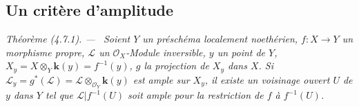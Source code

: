 \documentclass[10pt,oneside]{book}
\newcommand{\oldpage}[2][]{%
  \setcounter{footnote}{0}%
  \marginpar{\scriptsize\textbf{#1}~|~#2}\ignorespaces}
\newenvironment{theorem}[1][]{%
  \par\medskip\noindent\itshape Théorème (#1). ---\ }{\par}
\begin{document}
\oldpage[III]{145}

\subsection{Un critère d'amplitude}

\begin{theorem}[4.7.1]
\label{III.4.7.1-fr}
Soient $Y$ un préschéma localement noethérien, $f:X\to Y$ un morphisme
propre, $\mathcal L$ un $\mathcal O_X$-Module inversible, $y$ un point de
$Y$, $X_y=X\otimes_Y\boldsymbol{k}(y)=f^{-1}(y)$, $g$ la projection de $X_y$ dans $X$.
Si $\mathcal L_y=g^*(\mathcal L)=\mathcal L\otimes_{\mathcal O_Y}\boldsymbol{k}(y)$ est
ample sur $X_y$, il existe un voisinage ouvert $U$ de $y$ dans $Y$ tel que
$\mathcal L|f^{-1}(U)$ soit ample pour la restriction de $f$ à $f^{-1}(U)$.
\end{theorem}
\end{document}
